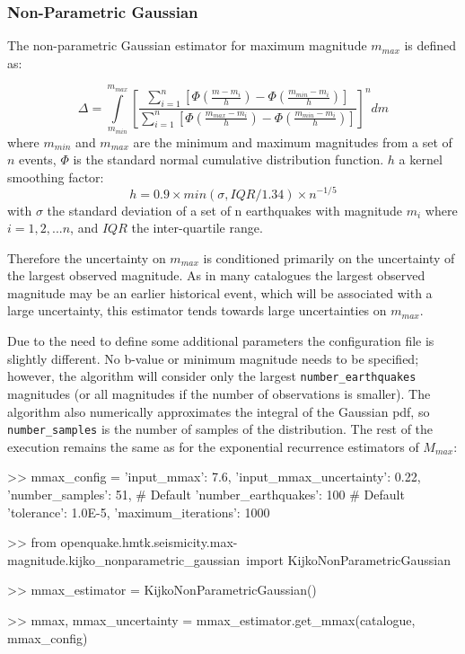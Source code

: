 \subsubsection{Non-Parametric Gaussian}

The non-parametric Gaussian estimator for maximum magnitude $m_{max}$ is defined as:

\begin{equation}
\Delta = \int\limits_{m_{min}}^{m_{max}} \left[ {\frac{\sum_{i = 1}^{n} \left[ {\Phi \left( {\frac{m - m_i}{h}} \right) - \Phi \left( {\frac{m_{min} - m_i}{h}} \right)} \right]}{\sum_{i = 1}^{n} \left[ {\Phi \left( {\frac{m_{max} - m_i}{h}} \right) - \Phi \left( {\frac{m_{min} - m_i}{h}} \right)} \right]}} \right]^n  dm
\end{equation}
where $m_{min}$ and $m_{max}$ are the minimum and maximum magnitudes from a set of $n$ events, $\Phi$ is the standard normal cumulative distribution function. $h$ a kernel smoothing factor:
\begin{equation}
h = 0.9 \times min\left( {\sigma, IQR / 1.34} \right) \times n^{-1 / 5}
\end{equation}
with $\sigma$ the standard deviation of a set of n earthquakes with magnitude $m_{i}$ where $i = 1, 2, ... n$, and $IQR$ the inter-quartile range. 

Therefore the uncertainty on $m_{max}$ is conditioned primarily on the uncertainty of the largest observed magnitude. As in many catalogues the largest observed magnitude may be an earlier historical event, which will be associated with a large uncertainty, this estimator tends towards large uncertainties on $m_{max}$.

Due to the need to define some additional parameters the configuration file is slightly different. No b-value or minimum magnitude needs to be specified; however, the algorithm will consider only the largest \verb=number_earthquakes= magnitudes (or all magnitudes if the number of observations is smaller). The algorithm also numerically approximates the integral of the Gaussian pdf, so \verb=number_samples= is the number of samples of the distribution. The rest of the execution remains the same as for the exponential recurrence estimators of $M_{max}$:

\begin{python}[frame=single]
>> mmax_config = {'input_mmax': 7.6,
                  'input_mmax_uncertainty': 0.22,
                  'number_samples': 51, # Default
                  'number_earthquakes': 100 # Default 
                  'tolerance': 1.0E-5, 
                  'maximum_iterations': 1000}
                       
>> from openquake.hmtk.seismicity.max-magnitude.kijko_nonparametric_gaussian\
     import KijkoNonParametricGaussian

>> mmax_estimator = KijkoNonParametricGaussian()

>> mmax, mmax_uncertainty = mmax_estimator.get_mmax(catalogue,
                                                    mmax_config)
                
\end{python}


